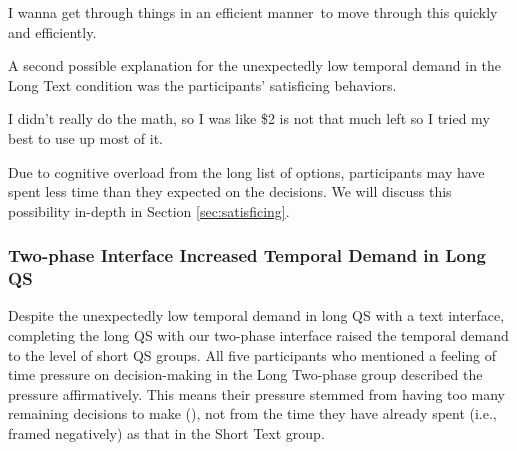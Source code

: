 \begin{displayquote}
I wanna get through things in an efficient manner~\bracketellipsis to move through this quickly and efficiently. \hfill{}
\end{displayquote}


A second possible explanation for the unexpectedly low temporal demand in the Long Text condition was the participants' satisficing behaviors. 

\begin{displayquote}
I didn't really do the math, so I was like \$2 is not that much left so I tried my best to use up most of it. \\\hfill{}
\end{displayquote}

Due to cognitive overload from the long list of options, participants may have spent less time than they expected on the decisions. We will discuss this possibility in-depth in Section \ref{sec:satisficing}.

\subsubsection{Two-phase Interface Increased Temporal Demand in Long QS} Despite the unexpectedly low temporal demand in long QS with a text interface, completing the long QS with our two-phase interface raised the temporal demand to the level of short QS groups. All five participants who mentioned a feeling of time pressure on decision-making in the Long Two-phase group described the pressure affirmatively. This means their pressure stemmed from having too many remaining decisions to make (), not from the time they have already spent (i.e., framed negatively) as that in the Short Text group. 


